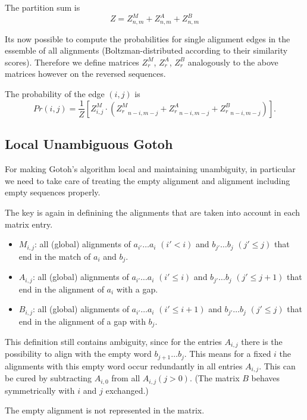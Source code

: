 \documentclass{article}
\begin{document}
The partition sum is
\begin{displaymath}
  Z = Z^M_{n,m} + Z^A_{n,m} + Z^B_{n,m}
\end{displaymath}


Its now possible to compute the probabilities for single alignment edges in
the essemble of all alignments (Boltzman-distributed according to their
similarity scores). Therefore we define matrices $Z^M_r$, $Z^A_r$, $Z^B_r$
analogously to the above matrices however on the reversed sequences.

The probability of the edge $(i,j)$ is
\begin{displaymath}
  Pr(i,j) = \frac{1}{Z}[Z^M_{i,j} \cdot ({Z^M_r}_{n-i,m-j} + {Z^A_r}_{n-i,m-j} +
  {Z^B_r}_{n-i,m-j})].
\end{displaymath}

\subsection{Local Unambiguous Gotoh}

For making Gotoh's algorithm local and maintaining unambiguity, in particular
we need to take care of treating the empty alignment and alignment including empty sequences properly.

The key is again in definining the alignments that are taken into account in
each matrix entry. 
\begin{itemize}
\item $M_{i,j}$: all (global) alignments of $a_{i'}\dots a_i$ $(i'<i)$ and
  $b_{j'}\dots b_j$ $(j'\leq j)$ that end in the match of $a_i$ and $b_j$. 
\item $A_{i,j}$: all (global) alignments of $a_{i'}\dots a_i$ $(i' \leq i)$ and
  $b_{j'}\dots b_{j}$ $(j'\leq j+1)$ that end in the alignment of $a_i$ with a gap.
\item $B_{i,j}$: all (global) alignments of $a_{i'}\dots a_{i}$
  $(i'\leq i+1)$ and $b_{j'}\dots b_j$ $(j' \leq j)$ that end in the alignment of
  a gap with $b_j$.
\end{itemize}

This definition still contains ambiguity, since for the entries $A_{i,j}$ there
is the possibility to align with the empty word $b_{j+1}\dots b_j$. This means
for a fixed $i$ the alignments with this empty word occur redundantly in all
entries $A_{i,j}$. This can be cured by subtracting $A_{i,0}$ from all $A_{i,j}
(j>0)$. (The matrix $B$ behaves symmetrically with $i$ and $j$ exchanged.)

The empty alignment is not represented in the matrix.
\end{document}
